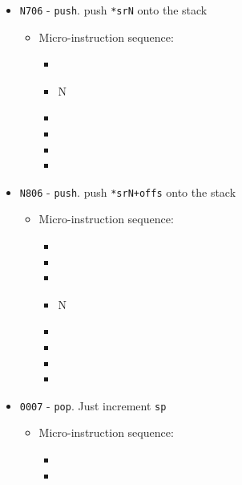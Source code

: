 \documentclass{article}
\begin{document}
\begin{itemize}
    \item \Verb|N706| - \Verb|push|. push \Verb|*srN| onto the stack
    \begin{itemize}
        \item Micro-instruction sequence:
        \begin{itemize}
            \item \decrementsp
            \item \specialptodata N
            \item \holddata
            \item \sptoaddr
            \item \writeRAM
            \item \done
        \end{itemize}
    \end{itemize}

    
    \item \Verb|N806| - \Verb|push|. push \Verb|*srN+offs| onto the stack
    \begin{itemize}
        \item Micro-instruction sequence:
        \begin{itemize}
            \item \pkptroutinc
            \item \datatooffs
            \item \decrementsp
            \item \specialptodatao N
            \item \holddata
            \item \sptoaddr
            \item \writeRAM
            \item \done
        \end{itemize}
    \end{itemize}

    \item \Verb|0007| - \Verb|pop|. Just increment \Verb|sp|
    \begin{itemize}
        \item Micro-instruction sequence:
        \begin{itemize}
            \item \incrementsp
            \item \done
        \end{itemize}
    \end{itemize}


\end{itemize}
\end{document}
